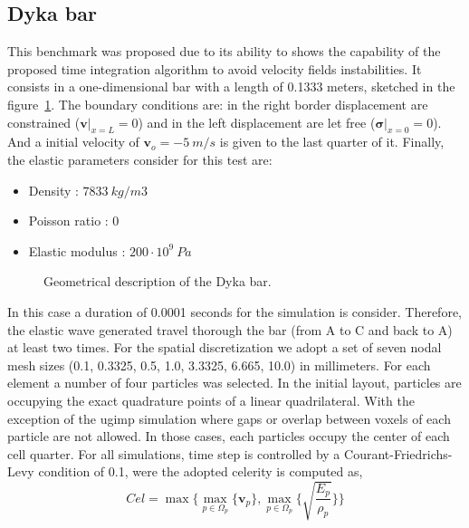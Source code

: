 \documentclass[preprint,12pt,a4paper]{elsarticle}
\newcommand{\vect}[1]{
  \ensuremath{\mathbf{{#1}}}
}
\newcommand{\tens}[1]{
  \ensuremath{\mathbf{{#1}}}
}
\begin{document}
\subsection{Dyka bar \cite{Dyka1995}}
\label{sec:dyka-bar}

This benchmark was proposed due to its ability to shows the capability
of the proposed time integration algorithm to avoid velocity
fields instabilities. It consists in a one-dimensional bar with a
length of 0.1333 meters, sketched in the
figure~\ref{fig:Dyka_Bar}. The boundary conditions are: in the right
border displacement are constrained ($\vect{v} \rvert_{x=L} = 0$) and
in the left displacement are let free ($\tens{\sigma} \rvert_{x=0} =
0$). And a initial velocity of $\vect{v}_o = - 5\ m/s$ is given to the
last quarter of it. Finally, the elastic parameters consider for this test are:
\begin{itemize} 
\item  Density : $7833\ kg/m3$
\item  Poisson ratio : $0$
\item  Elastic modulus : $200 \cdot 10^9\ Pa$
\end{itemize}
\begin{figure}\sidecaption
  \centering
  \resizebox{\hsize}{!}{
    }
  \caption{Geometrical description of the Dyka \cite{Dyka1995} bar.}
  \label{fig:Dyka_Bar}
\end{figure}
In this case a duration of 0.0001 seconds for the simulation is
consider. Therefore, the elastic wave generated travel thorough the bar
(from A to C and back to A) at least two times. For the spatial
discretization we adopt a set of seven nodal mesh sizes (0.1, 0.3325, 0.5,
1.0, 3.3325, 6.665, 10.0) in millimeters. For each element a number of
four particles was selected. In the initial layout, particles are
occupying the exact quadrature points of a linear quadrilateral. With
the exception of the \acrshort{ugimp} simulation where gaps or overlap between
voxels of each particle are not allowed. In those cases, each particles
occupy the center of each cell quarter. For all simulations, time step
is controlled by a Courant-Friedrichs-Levy condition of 0.1, were the adopted
celerity is computed as,
\begin{equation}
  \label{eq:Cel}
  Cel = \max\{\max_{p \in \Omega_p}\{ \vect{v}_p \} , \max_{p \in \Omega_p}\{ \sqrt{\frac{E_p}{\rho_p}} \} \}
\end{equation}
\end{document}
